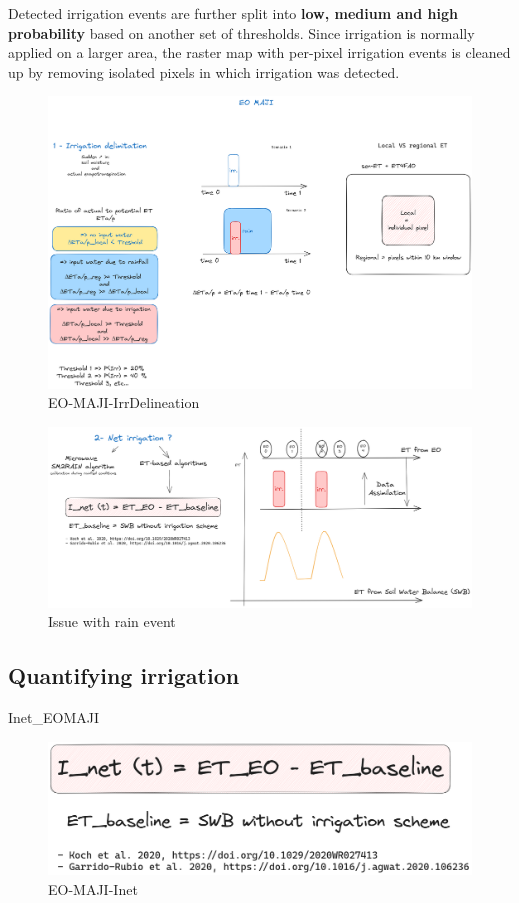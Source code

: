 \documentclass{article}
\begin{document}
Detected irrigation events are further split into \textbf{low, medium and high probability} based on another set
of thresholds. Since irrigation is normally applied on a larger area, the raster map with per-pixel
irrigation events is cleaned up by removing isolated pixels in which irrigation was detected.

\begin{figure}[!htbp]
\centering
\includegraphics[width=0.375\linewidth]{files/EO-MAJI-IrrDelineati-f37af6d89c8d3154757841641d758e25.png}
\caption*{EO-MAJI-IrrDelineation}
\end{figure}

\begin{figure}[!htbp]
\centering
\includegraphics[width=0.375\linewidth]{files/EO-MAJI-IrrNet-3a015ba044e67d3d0d8460677742b6be.png}
\caption*{Issue with rain event}
\end{figure}

\subsection{Quantifying irrigation}

Inet\_EOMAJI

\begin{figure}[!htbp]
\centering
\includegraphics[width=0.75\linewidth]{files/Inet_EOMAJI-c4b87b879641d93a98c453dcee2215b6.png}
\caption*{EO-MAJI-Inet}
\end{figure}
\end{document}
